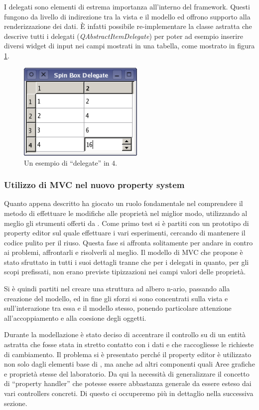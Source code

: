I delegati sono elementi di estrema importanza all'interno del framework. Questi fungono da livello di indirezione tra la vista e il modello ed offrono supporto alla renderizzazione dei dati. È infatti possibile re-implementare la classe astratta che descrive tutti i delegati (\emph{QAbstractItemDelegate}) per poter ad esempio inserire diversi widget di input nei campi mostrati in una tabella, come mostrato in figura \ref{figura:qt_delegate}.

\begin{figure}[!htb]
	\centering
	\includegraphics[width=6cm]{images/spinboxdelegate-example.png}
	\caption{Un esempio di ``delegate'' in \qt{}$4$.}
	\label{figura:qt_delegate}
\end{figure}

\subsubsection*{Utilizzo di MVC nel nuovo property system}
Quanto appena descritto ha giocato un ruolo fondamentale nel comprendere il metodo di effettuare le modifiche alle proprietà nel miglior modo, utilizzando al meglio gli strumenti offerti da \qt{}. Come primo test si è partiti con un prototipo di property editor sul quale effettuare i vari esperimenti, cercando di mantenere il codice pulito per il riuso.
Questa fase si affronta solitamente per andare in contro ai problemi, affrontarli e risolverli al meglio. Il modello di MVC che \qt{} propone è stato sfruttato in tutti i suoi dettagli tranne che per i delegati in quanto, per gli scopi prefissati, non erano previste tipizzazioni nei campi valori delle proprietà.

Si è quindi partiti nel creare una struttura ad albero n-ario, passando alla creazione del modello, ed in fine gli sforzi si sono concentrati sulla vista e sull'interazione tra essa e il modello stesso, ponendo particolare attenzione all'accoppiamento e alla coesione degli oggetti.

Durante la modellazione è stato deciso di accentrare il controllo su di un entità astratta che fosse stata in stretto contatto con i dati e che raccogliesse le richieste di cambiamento. Il problema si è presentato perché il property editor è utilizzato non solo dagli elementi base di \visualnetkit{}, ma anche ad altri componenti quali Aree grafiche e proprietà stesse del laboratorio. Da qui la necessità di generalizzare il concetto di ``property handler'' che potesse essere abbastanza generale da essere esteso dai vari controllers concreti. Di questo ci occuperemo più in dettaglio nella successiva sezione.

